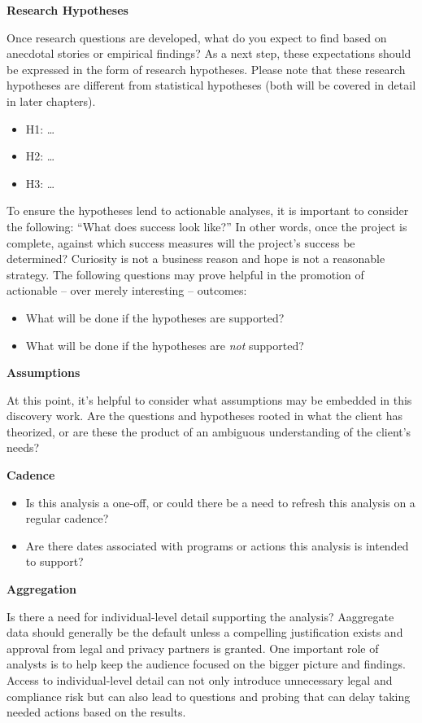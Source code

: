 \documentclass[
]{book}
\providecommand{\tightlist}{%
  \setlength{\itemsep}{0pt}\setlength{\parskip}{0pt}}
\begin{document}
\textbf{Research Hypotheses}

Once research questions are developed, what do you expect to find based on anecdotal stories or empirical findings? As a next step, these expectations should be expressed in the form of research hypotheses. Please note that these research hypotheses are different from statistical hypotheses (both will be covered in detail in later chapters).

\begin{itemize}
\tightlist
\item
  H1: \ldots{}
\item
  H2: \ldots{}
\item
  H3: \ldots{}
\end{itemize}

To ensure the hypotheses lend to actionable analyses, it is important to consider the following: ``What does success look like?'' In other words, once the project is complete, against which success measures will the project's success be determined? Curiosity is not a business reason and hope is not a reasonable strategy. The following questions may prove helpful in the promotion of actionable -- over merely interesting -- outcomes:

\begin{itemize}
\tightlist
\item
  What will be done if the hypotheses are supported?
\item
  What will be done if the hypotheses are \emph{not} supported?
\end{itemize}

\textbf{Assumptions}

At this point, it's helpful to consider what assumptions may be embedded in this discovery work. Are the questions and hypotheses rooted in what the client has theorized, or are these the product of an ambiguous understanding of the client's needs?

\textbf{Cadence}

\begin{itemize}
\tightlist
\item
  Is this analysis a one-off, or could there be a need to refresh this analysis on a regular cadence?
\item
  Are there dates associated with programs or actions this analysis is intended to support?
\end{itemize}

\textbf{Aggregation}

Is there a need for individual-level detail supporting the analysis? Aaggregate data should generally be the default unless a compelling justification exists and approval from legal and privacy partners is granted. One important role of analysts is to help keep the audience focused on the bigger picture and findings. Access to individual-level detail can not only introduce unnecessary legal and compliance risk but can also lead to questions and probing that can delay taking needed actions based on the results.
\end{document}
